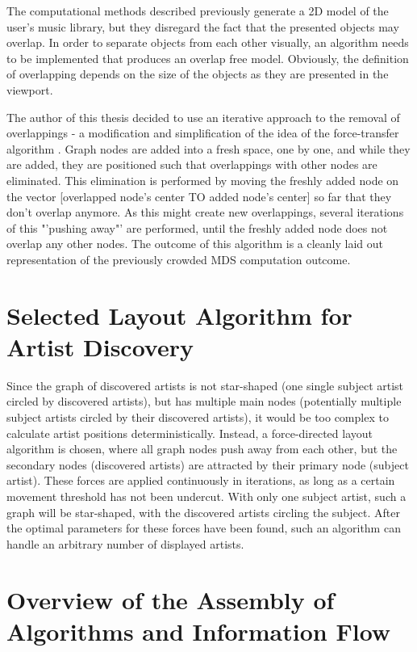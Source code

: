 The computational methods described previously generate a 2D model of the user's music library, but they disregard the fact that the presented objects may overlap. In order to separate objects from each other visually, an algorithm needs to be implemented that produces an overlap free model. Obviously, the definition of overlapping depends on the size of the objects as they are presented in the viewport.

The author of this thesis decided to use an iterative approach to the removal of overlappings - a modification and simplification of the idea of the force-transfer algorithm \cite{Huang03force-transfer:a}. Graph nodes are added into a fresh space, one by one, and while they are added, they are positioned such that overlappings with other nodes are eliminated. This elimination is performed by moving the freshly added node on the vector [overlapped node's center TO added node's center] so far that they don't overlap anymore. As this might create new overlappings, several iterations of this "'pushing away"' are performed, until the freshly added node does not overlap any other nodes. The outcome of this algorithm is a cleanly laid out representation of the previously crowded MDS computation outcome.

\section{Selected Layout Algorithm for Artist Discovery}

Since the graph of discovered artists is not star-shaped (one single subject artist circled by discovered artists), but has multiple main nodes (potentially multiple subject artists circled by their discovered artists), it would be too complex to calculate artist positions deterministically. Instead, a force-directed layout algorithm is chosen, where all graph nodes push away from each other, but the secondary nodes (discovered artists) are attracted by their primary node (subject artist). These forces are applied continuously in iterations, as long as a certain movement threshold has not been undercut. With only one subject artist, such a graph will be star-shaped, with the discovered artists circling the subject. After the optimal parameters for these forces have been found, such an algorithm can handle an arbitrary number of displayed artists.

\section{Overview of the Assembly of Algorithms and Information Flow}

